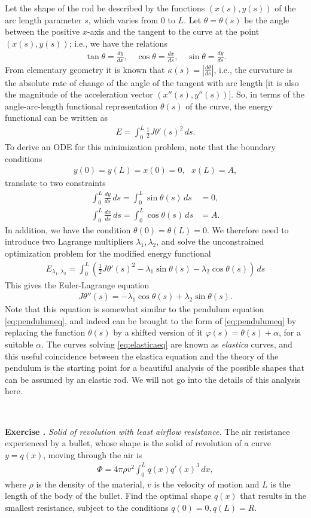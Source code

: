 \documentclass[12pt]{amsart}
\newcommand{\eq}[1]{\begin{equation}\begin{split}#1\end{split}\end{equation}}
\newcommand{\eqst}[1]{\begin{align*}#1\end{align*}}
\newcommand{\der}[2]{\frac{d#1}{d#2}}
\newcounter{exercise}
\newcommand{\beginexercise}[1]{\ \\ \addtocounter{exercise}{1} \textbf{Exercise \arabic{exercise}.} \textit{#1.}}
\begin{document}
Let the shape of the rod be described by the functions $(x(s), y(s))$ of the arc length parameter $s$, which varies from $0$ to $L$. Let $\theta=\theta(s)$ be the angle between the positive $x$-axis and the tangent to the curve at the point $(x(s),y(s))$; i.e., we have the relations
\eqst{ \tan \theta = \der{y}{x}, \quad \cos\theta = \der{x}{s}, \quad \sin\theta = \der{y}{s}. }
From elementary geometry it is known that $\kappa(s) = |\der{\theta}{s}|$, i.e., the curvature is the absolute rate of change of the angle of the tangent with arc length [it is also the magnitude of the acceleration vector $(x''(s),y''(s))$]. So, in terms of the angle-arc-length functional representation $\theta(s)$ of the curve, the energy functional can be written as
\eqst{ E = \int_0^L \tfrac12 J \theta'(s)^2 \,ds. }
To derive an ODE for this minimization problem, note that the boundary conditions
\eqst{ 
y(0) = y(L) = x(0)= 0, \ \ \ x(L)=A,
} 
translate to two constraints
\eqst{
\int_0^L \der{y}{s}\,ds = \int_0^L \sin\theta(s)\,ds &= 0, \\
\int_0^L \der{x}{s}\,ds = \int_0^L \cos\theta(s)\,ds &= A.
}
In addition, we have the condition $\theta(0)=\theta(L)=0$.
We therefore need to introduce two Lagrange multipliers $\lambda_1, \lambda_2$, and solve the unconstrained optimization problem for the modified energy functional
\eqst{ E_{\lambda_1, \lambda_2} = \int_0^L \left(\tfrac12 J \theta'(s)^2 - \lambda_1 \sin\theta(s) - \lambda_2 \cos\theta(s)\right)\,ds }
This gives the Euler-Lagrange equation
\eq{ \label{eq:elasticaeq}
J \theta''(s) = -\lambda_1 \cos \theta(s) + \lambda_2 \sin\theta(s).
}
Note that this equation is somewhat similar to the pendulum equation \eqref{eq:pendulumeq}, and indeed can be brought to the form of \eqref{eq:pendulumeq} by replacing the function $\theta(s)$ by a shifted version of it $\varphi(s)=\theta(s)+\alpha$, for a suitable $\alpha$. The curves solving \eqref{eq:elasticaeq} are known as \emph{elastica} curves, and this useful coincidence between the elastica equation and the theory of the pendulum is the starting point for a beautiful analysis of the possible shapes that can be assumed by an elastic rod. We will not go into the details of this analysis here.

\beginexercise{Solid of revolution with least airflow resistance}
The air resistance experienced by a bullet, whose shape is the solid of revolution of a curve $y=q(x)$, moving through the air is
\eqst{ \Phi = 4\pi \rho v^2 \int_0^L q(x) q'(x)^3\,dx, }
where $\rho$ is the density of the material, $v$ is the velocity of motion and $L$ is the length of the body of the bullet. Find the optimal shape $q(x)$ that results in the smallest resistance, subject to the conditions $q(0)=0, q(L)=R$.
\end{document}
